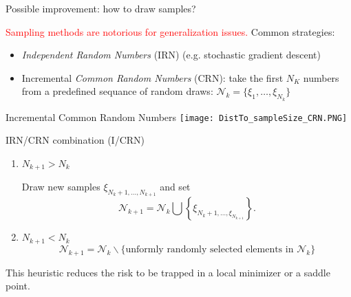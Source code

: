 \documentclass{beamer}
\begin{document}
\begin{frame}{Possible improvement: how to draw samples?}
	
	\textcolor{red}{Sampling methods are notorious for generalization issues.}
	Common strategies:
	\begin{itemize}
		\item \textit{Independent Random Numbers} (IRN) (e.g. stochastic gradient descent)
		\item Incremental \textit{Common Random Numbers} (CRN): take the first $N_K$ numbers from a predefined sequance of random draws: $\mathcal{N}_k = \{ \xi_1, \ldots, \xi_{N_k} \}$
	\end{itemize}
	
\end{frame}

\begin{frame}{Incremental Common Random Numbers}    
	\centering
	\texttt{[image: DistTo\_sampleSize\_CRN.PNG]}
\end{frame}

\begin{frame}{IRN/CRN combination (I/CRN)}
	
	\begin{enumerate}
		\item $N_{k+1} > N_k$
		
		Draw new samples $\xi_{N_{k}+1,\ldots,N_{k+1}}$ and set
		$$
		\mathcal{N}_{k+1} = \mathcal{N}_k \bigcup \left\{ \xi_{N_{k}+1,\ldots,\xi_{N_{k+1}}} \right\}.
		$$
		
		\item $N_{k+1} < N_k$
		$$\mathcal{N}_{k+1} = \mathcal{N}_k \backslash  \{\text{unformly randomly selected elements in } \mathcal{N}_k\}$$
	\end{enumerate}
	
	This heuristic reduces the risk to be trapped in a local minimizer or a saddle point.
	
\end{frame}
\end{document}

